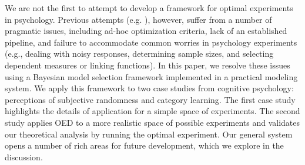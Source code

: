 \documentclass{article}
\newcommand{\ndg}[1]{\textcolor{Green}{[ndg: #1]}}
\begin{document}

We are not the first to attempt to develop a framework for optimal experiments in psychology.
Previous attempts (e.g. \cite{Myung2009}), however, suffer from a number of pragmatic issues, including ad-hoc optimization criteria, lack of an established pipeline, and failure to accommodate common worries in psychology experiments (e.g., dealing with noisy responses, determining sample sizes, and selecting dependent measures or linking functions).
In this paper, we resolve these issues using a Bayesian model selection framework implemented in a practical modeling system.
We apply this framework to two case studies from cognitive psychology: perceptions of subjective randomness and category learning.
The first case study highlights the details of application for a simple space of experiments.
The second study applies OED to a more realistic space of possible experiments and validates our theoretical analysis by running the optimal experiment.
Our general system opens a number of rich areas for future development, which we explore in the discussion.

\end{document}
